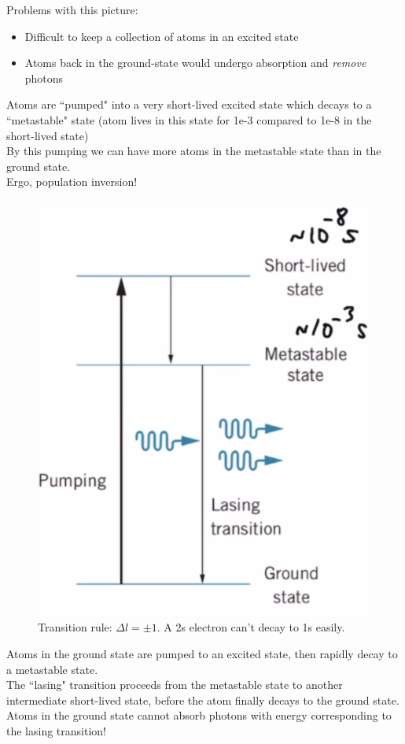 \documentclass[class=article,crop=false]{standalone}
\begin{document}
Problems with this picture:
\begin{itemize}
	\item Difficult to keep a collection of atoms in an excited state
	\item Atoms back in the ground-state would undergo absorption and \emph{remove} photons
\end{itemize}

\begin{result}
	Atoms are ``pumped" into a very short-lived excited state which decays to a ``metastable" state (atom lives in this state for 1e-3 compared to 1e-8 in the short-lived state) \\
	By this pumping we can have more atoms in the metastable state than in the ground state. \\
	Ergo, population inversion!
\end{result}

\begin{figure}[h!]
	\centering
	\includegraphics[width=.6\linewidth]{./Images/population_inversion.png}
	\caption{Transition rule: $\Delta l = \pm 1$. A 2s electron can't decay to 1s easily.}
\end{figure}


\newpage
\begin{result}
	Atoms in the ground state are pumped to an excited state, then rapidly decay to a metastable state.\\


	The ``lasing" transition proceeds from the metastable state to another intermediate short-lived state, before the atom finally decays to the ground state.\\

	Atoms in the ground state cannot absorb photons with energy corresponding to the lasing transition!
\end{result}
\end{document}
